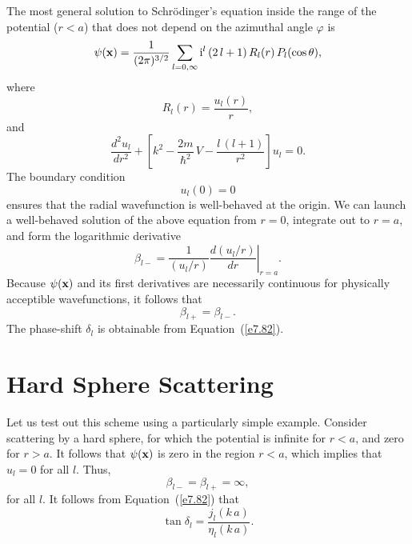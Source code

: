 The most general solution to Schr\"{o}dinger's equation inside 
the range of the potential ($r<a$) that does not depend on the
azimuthal angle $\varphi$ is
\begin{equation}
\psi({\bf x}) = \frac{1}{(2\pi)^{3/2}}\sum_{l=0,\infty}
{\rm i}^l \,(2\,l+1)\,R_l(r)\,P_l(\cos\theta),
\end{equation}
where
\begin{equation}
R_l (r) = \frac{u_l(r)}{r},
\end{equation}
and
\begin{equation}\label{e7.85}
\frac{d^2 u_l}{d r^2} +\left[k^2 - \frac{2m}{\hbar^2} \,V - \frac{l\,(l+1)}
{r^2}\right] u_l = 0.
\end{equation}
The boundary condition 
\begin{equation}\label{e7.86}
u_l(0) = 0
\end{equation}
 ensures that the radial wavefunction is well-behaved at the
origin. 
We can launch a well-behaved solution of the above equation from 
$r=0$, integrate out to $r=a$, and form the logarithmic derivative
\begin{equation}
\beta_{l-} = \left.\frac{1}{(u_l/r)} \frac{d(u_l/r)}{dr}\right|_{r=a}.
\end{equation}
Because $\psi({\bf x})$ and its first derivatives are necessarily continuous for
physically acceptible wavefunctions, it follows that
\begin{equation}
\beta_{l+} = \beta_{l-}.
\end{equation}
The phase-shift $\delta_l$ is obtainable from Equation~(\ref{e7.82}).

\section{Hard Sphere Scattering}
Let us test out this scheme using a particularly simple example. Consider
scattering by a hard sphere, for which  the potential is infinite 
for $r<a$, and zero for $r>a$. It follows that $\psi({\bf x})$ is
zero in the region $r<a$, which implies that  $u_l =0$ for all $l$. 
Thus,
\begin{equation}
\beta_{l-} = \beta_{l+} = \infty,
\end{equation}
for all $l$. It follows from Equation~(\ref{e7.82}) that
\begin{equation}\label{e7.90}
\tan \delta_l = \frac{j_l(k\,a)}{\eta_l(k\,a)}.
\end{equation}

